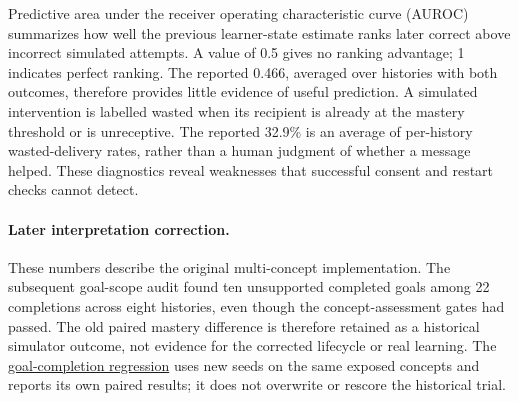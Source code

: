 Predictive area under the receiver operating characteristic curve (AUROC) summarizes how well the previous learner-state estimate ranks
later correct above incorrect simulated attempts. A value of 0.5 gives no ranking
advantage; 1 indicates perfect ranking. The reported 0.466, averaged over histories with both outcomes, therefore
provides little evidence of useful prediction. A simulated intervention is labelled
wasted when its recipient is already at the mastery threshold or is unreceptive.
The reported 32.9\% is an average of per-history wasted-delivery rates, rather
than a human judgment of whether a message helped. These diagnostics reveal
weaknesses that successful consent and restart checks cannot detect.


\paragraph{Later interpretation correction.}
These numbers describe the original multi-concept implementation. The subsequent
goal-scope audit found ten unsupported completed goals among 22 completions
across eight histories, even though the concept-assessment gates had passed.
The old paired mastery difference is therefore retained as a historical
simulator outcome, not evidence for the corrected lifecycle or real learning.
The \hyperref[study-H]{goal-completion regression} uses new seeds on the same exposed concepts and reports its own
paired results; it does not overwrite or rescore the historical trial.
